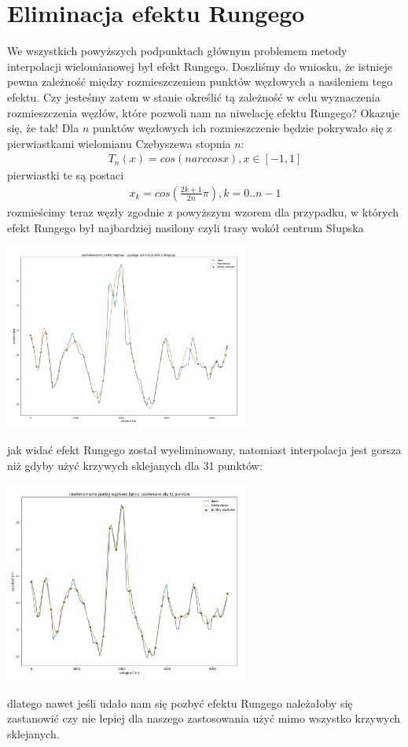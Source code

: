 \documentclass{article}
\begin{document}
\section{Eliminacja efektu Rungego}
We wszystkich powyższych podpunktach głównym problemem metody interpolacji wielomianowej był efekt Rungego. Doszliśmy do wniosku, że istnieje 
pewna zależność między rozmieszczeniem punktów węzłowych a nasileniem tego efektu. Czy jesteśmy zatem w stanie określić tą zależność w celu wyznaczenia
rozmieszczenia węzłów, które pozwoli nam na niwelację efektu Rungego? Okazuje się, że tak! Dla $n$ punktów węzłowych ich rozmieszczenie będzie pokrywało się
z pierwiastkami wielomianu Czebyszewa stopnia $n$:
\begin{gather*}
	T_n(x) = cos(narccos x), x \in [-1, 1]
\end{gather*}
pierwiastki te są postaci
\begin{gather*}
	x_k = cos(\frac{2k+1}{2n} \pi), k= 0..n-1
\end{gather*}
rozmieścimy teraz węzły zgodnie z powyższym wzorem dla przypadku, w których efekt Rungego był najbardziej nasilony czyli trasy wokół centrum Słupska
 \begin{center}
	\includegraphics[width=8cm]{lagrange_runge_gone}
\end{center}
jak widać efekt Rungego został wyeliminowany, natomiast interpolacja jest gorsza niż gdyby użyć krzywych sklejanych dla 31 punktów:
 \begin{center}
	\includegraphics[width=8cm]{spline_runge_comparison}
\end{center}
dlatego nawet jeśli udało nam się pozbyć efektu Rungego należałoby się zastanowić czy nie lepiej dla naszego zastosowania użyć mimo wszystko krzywych sklejanych.
\end{document}
